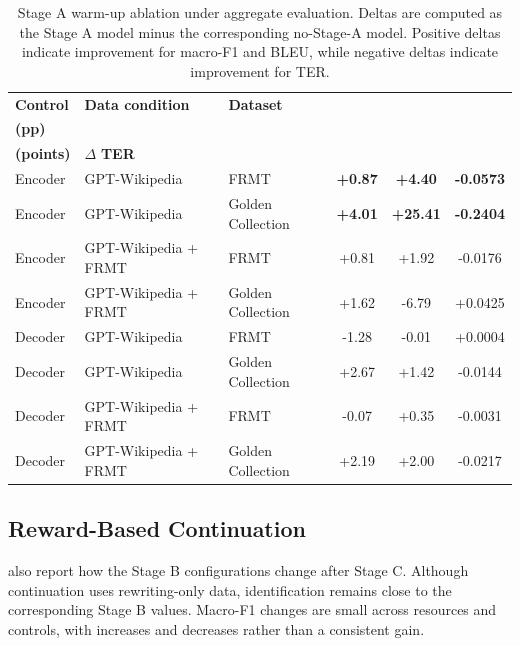 \documentclass[acmtog,nonacm]{acmart}
\begin{document}
\begin{table}[tbp]
\centering
\small
\renewcommand{\arraystretch}{1.12}
\setlength{\tabcolsep}{5pt}
\caption{Stage A warm-up ablation under aggregate evaluation. Deltas are computed as the Stage A model minus the corresponding no-Stage-A model. Positive deltas indicate improvement for macro-F1 and BLEU, while negative deltas indicate improvement for TER.}
\label{tab:stage-a-ablation}
\begin{tabular}{@{}llp{3.2cm}ccc@{}}
\toprule
\textbf{Control} & \textbf{Data condition} & \textbf{Dataset}
& \shortstack{\(\Delta\) \textbf{Macro-F1}\\\textbf{(pp)}}
& \shortstack{\(\Delta\) \textbf{BLEU}\\\textbf{(points)}}
& \(\Delta\) \textbf{TER} \\
\midrule
Encoder & GPT-Wikipedia & FRMT & \textbf{+0.87} & \textbf{+4.40} & \textbf{-0.0573} \\
Encoder & GPT-Wikipedia & Golden Collection & \textbf{+4.01} & \textbf{+25.41} & \textbf{-0.2404} \\
Encoder & GPT-Wikipedia + FRMT & FRMT & +0.81 & +1.92 & -0.0176 \\
Encoder & GPT-Wikipedia + FRMT & Golden Collection & +1.62 & -6.79 & +0.0425 \\
\midrule
Decoder & GPT-Wikipedia & FRMT & -1.28 & -0.01 & +0.0004 \\
Decoder & GPT-Wikipedia & Golden Collection & +2.67 & +1.42 & -0.0144 \\
Decoder & GPT-Wikipedia + FRMT & FRMT & -0.07 & +0.35 & -0.0031 \\
Decoder & GPT-Wikipedia + FRMT & Golden Collection & +2.19 & +2.00 & -0.0217 \\
\bottomrule
\end{tabular}
\end{table}

\subsection{Reward-Based Continuation}
\label{sec:reward-continuation-results}

 also
report how the Stage B configurations change after Stage C. Although
continuation uses rewriting-only data, identification remains close to the
corresponding Stage B values. Macro-F1 changes are small across resources and controls, with increases and decreases rather than a consistent gain.
\end{document}
